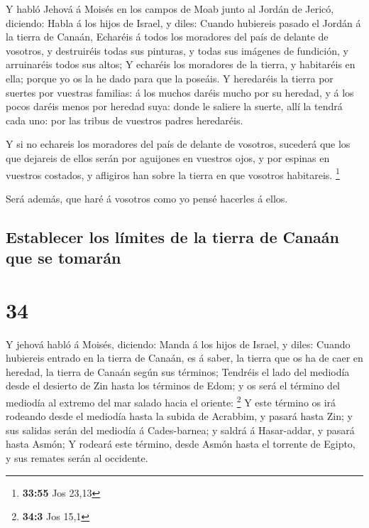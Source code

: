  Y habló Jehová á Moisés en los campos de Moab junto al
Jordán de Jericó, diciendo:  Habla á los hijos de Israel, y
diles: Cuando hubiereis pasado el Jordán á la tierra de Canaán,
 Echaréis á todos los moradores del país de delante de
vosotros, y destruiréis todas sus pinturas, y todas sus imágenes de
fundición, y arruinaréis todos sus altos;  Y echaréis los
moradores de la tierra, y habitaréis en ella; porque yo os la he dado
para que la poseáis.  Y heredaréis la tierra por suertes
por vuestras familias: á los muchos daréis mucho por su heredad, y á los
pocos daréis menos por heredad suya: donde le saliere la suerte, allí la
tendrá cada uno: por las tribus de vuestros padres heredaréis.

 Y si no echareis los moradores del país de delante de
vosotros, sucederá que los que dejareis de ellos serán por aguijones en
vuestros ojos, y por espinas en vuestros costados, y afligiros han sobre
la tierra en que vosotros habitareis. \footnote{\textbf{33:55} Jos 23,13}

 Será además, que haré á vosotros como yo pensé hacerles á
ellos.

\hypertarget{establecer-los-luxedmites-de-la-tierra-de-canauxe1n-que-se-tomaruxe1n}{%
\subsection{Establecer los límites de la tierra de Canaán que se
tomarán}\label{establecer-los-luxedmites-de-la-tierra-de-canauxe1n-que-se-tomaruxe1n}}

\hypertarget{section-33}{%
\section{34}\label{section-33}}

 Y jehová habló á Moisés, diciendo:  Manda á los
hijos de Israel, y diles: Cuando hubiereis entrado en la tierra de
Canaán, es á saber, la tierra que os ha de caer en heredad, la tierra de
Canaán según sus términos;  Tendréis el lado del mediodía
desde el desierto de Zin hasta los términos de Edom; y os será el
término del mediodía al extremo del mar salado hacia el oriente:
\footnote{\textbf{34:3} Jos 15,1}  Y este término os irá
rodeando desde el mediodía hasta la subida de Acrabbim, y pasará hasta
Zin; y sus salidas serán del mediodía á Cades-barnea; y saldrá á
Hasar-addar, y pasará hasta Asmón;  Y rodeará este término,
desde Asmón hasta el torrente de Egipto, y sus remates serán al
occidente.

